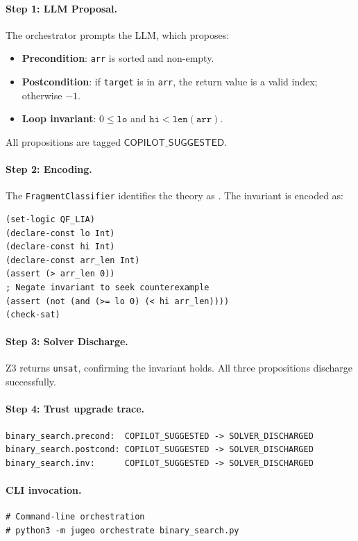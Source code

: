 \documentclass[11pt]{article}
\newcommand{\CopilotSugg}{\ensuremath{\mathsf{COPILOT\_SUGGESTED}}}
\begin{document}
\paragraph{Step 1: LLM Proposal.}
The orchestrator prompts the LLM, which proposes:
\begin{itemize}[noitemsep]
  \item \textbf{Precondition}: \texttt{arr} is sorted and non-empty.
  \item \textbf{Postcondition}: if \texttt{target} is in \texttt{arr},
        the return value is a valid index; otherwise $-1$.
  \item \textbf{Loop invariant}: $0 \le \mathtt{lo}$ and
        $\mathtt{hi} < \mathtt{len(arr)}$.
\end{itemize}
All propositions are tagged $\CopilotSugg$.

\paragraph{Step 2: Encoding.}
The \texttt{FragmentClassifier} identifies the theory as \QFLIA.
The invariant is encoded as:
\begin{lstlisting}[style=jugeo-output]
(set-logic QF_LIA)
(declare-const lo Int)
(declare-const hi Int)
(declare-const arr_len Int)
(assert (> arr_len 0))
; Negate invariant to seek counterexample
(assert (not (and (>= lo 0) (< hi arr_len))))
(check-sat)
\end{lstlisting}

\paragraph{Step 3: Solver Discharge.}
Z3 returns \texttt{unsat}, confirming the invariant holds.  All three
propositions discharge successfully.

\paragraph{Step 4: Trust upgrade trace.}
\begin{lstlisting}[style=jugeo-output]
binary_search.precond:  COPILOT_SUGGESTED -> SOLVER_DISCHARGED
binary_search.postcond: COPILOT_SUGGESTED -> SOLVER_DISCHARGED
binary_search.inv:      COPILOT_SUGGESTED -> SOLVER_DISCHARGED
\end{lstlisting}

\paragraph{CLI invocation.}
\begin{lstlisting}[style=jugeo-python]
# Command-line orchestration
# python3 -m jugeo orchestrate binary_search.py
\end{lstlisting}
\end{document}
